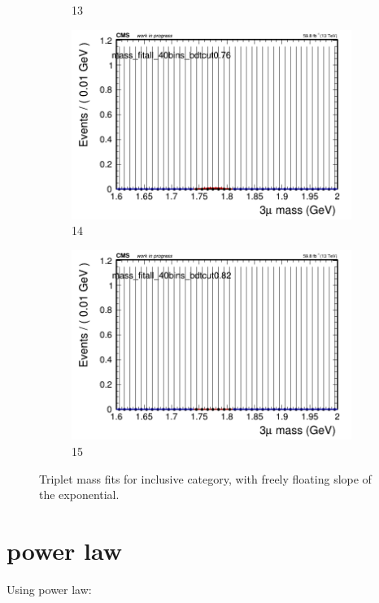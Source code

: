 \begin{figure}[h!]
\begin{subfigure}{0.2\textwidth}
        \caption{13}
    \end{subfigure}
    \begin{subfigure}{0.2\textwidth}
        \includegraphics[width=\textwidth]{unfixed_exp/plots/all/massfit_all_40bins_bdtcut0.76.png}
        \caption{14}
    \end{subfigure}
    \begin{subfigure}{0.2\textwidth}
        \includegraphics[width=\textwidth]{unfixed_exp/plots/all/massfit_all_40bins_bdtcut0.82.png}
        \caption{15}
    \end{subfigure}
    \caption{Triplet mass fits for inclusive category, with freely floating slope of the exponential.}
    \label{fig:unfixed_all}
\end{figure}


\section{power law}
\label{sec:power_law}
Using power law:


